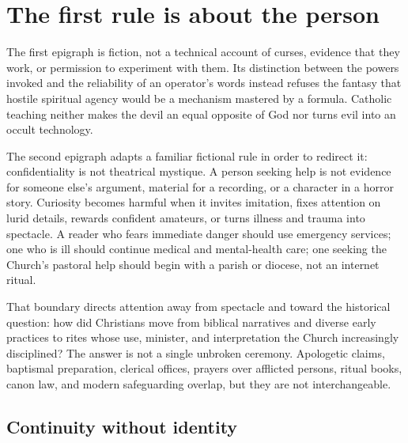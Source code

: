 \section{The first rule is about the person}


The first epigraph is fiction, not a technical account of curses, evidence
that they work, or permission to experiment with them. Its distinction between
the powers invoked and the reliability of an operator's words instead refuses
the fantasy that hostile spiritual agency would be a mechanism mastered by a
formula. Catholic teaching neither makes the devil an equal opposite of God
nor turns evil into an occult technology.

The second epigraph adapts a familiar fictional rule in order to redirect it:
confidentiality is not theatrical mystique. A person seeking help is not
evidence for someone else's argument, material for a recording, or a character
in a horror story. Curiosity becomes harmful when it invites imitation, fixes
attention on lurid details, rewards confident amateurs, or turns illness and
trauma into spectacle. A reader who fears immediate danger should use emergency
services; one who is ill should continue medical and mental-health care; one
seeking the Church's pastoral help should begin with a parish or diocese, not an
internet ritual.

That boundary directs attention away from spectacle and toward the historical
question: how did Christians move from biblical narratives and
diverse early practices to rites whose use, minister, and interpretation the
Church increasingly disciplined? The answer is not a single unbroken
ceremony. Apologetic claims, baptismal preparation, clerical offices, prayers
over afflicted persons, ritual books, canon law, and modern safeguarding
overlap, but they are not interchangeable.

\subsection{Continuity without identity}

